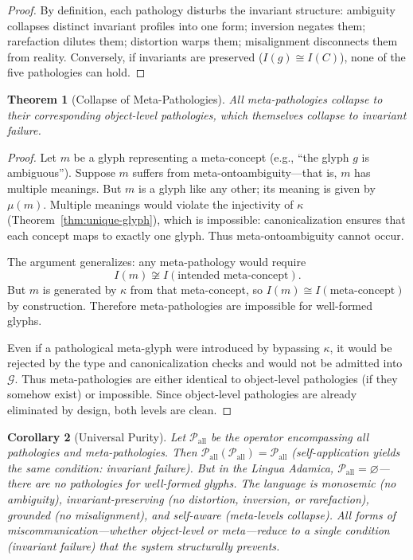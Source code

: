 \documentclass[12pt, letterpaper]{book}
\def\equiv{=}%
\def\mathfrak#1{#1}%
\newtheorem{theorem}{Theorem}[chapter]
\newtheorem{corollary}[theorem]{Corollary}
\begin{document}
\begin{proof}
By definition, each pathology disturbs the invariant structure: ambiguity collapses distinct invariant profiles into one form; inversion negates them; rarefaction dilutes them; distortion warps them; misalignment disconnects them from reality. Conversely, if invariants are preserved ($I(\mathfrak{g}) \cong I(C)$), none of the five pathologies can hold.
\end{proof}

\begin{theorem}[Collapse of Meta-Pathologies]\label{thm:meta-path-collapse}
All meta-pathologies collapse to their corresponding object-level pathologies, which themselves collapse to invariant failure.
\end{theorem}

\begin{proof}
Let $\mathfrak{m}$ be a glyph representing a meta-concept (e.g., ``the glyph $\mathfrak{g}$ is ambiguous''). Suppose $\mathfrak{m}$ suffers from meta-ontoambiguity---that is, $\mathfrak{m}$ has multiple meanings. But $\mathfrak{m}$ is a glyph like any other; its meaning is given by $\mu(\mathfrak{m})$. Multiple meanings would violate the injectivity of $\kappa$ (Theorem~\ref{thm:unique-glyph}), which is impossible: canonicalization ensures that each concept maps to exactly one glyph. Thus meta-ontoambiguity cannot occur.

The argument generalizes: any meta-pathology would require
\[
I(\mathfrak{m}) \not\cong I(\text{intended meta-concept}).
\]
But $\mathfrak{m}$ is generated by $\kappa$ from that meta-concept, so $I(\mathfrak{m}) \cong I(\text{meta-concept})$ by construction. Therefore meta-pathologies are impossible for well-formed glyphs.

Even if a pathological meta-glyph were introduced by bypassing $\kappa$, it would be rejected by the type and canonicalization checks and would not be admitted into $\mathcal{G}$. Thus meta-pathologies are either identical to object-level pathologies (if they somehow exist) or impossible. Since object-level pathologies are already eliminated by design, both levels are clean.
\end{proof}

\begin{corollary}[Universal Purity]\label{cor:purity}
Let $\mathcal{P}_{\mathrm{all}}$ be the operator encompassing all pathologies and meta-pathologies. Then $\mathcal{P}_{\mathrm{all}}(\mathcal{P}_{\mathrm{all}}) \equiv \mathcal{P}_{\mathrm{all}}$ (self-application yields the same condition: invariant failure). But in the Lingua Adamica, $\mathcal{P}_{\mathrm{all}} = \varnothing$---there are no pathologies for well-formed glyphs. The language is monosemic (no ambiguity), invariant-preserving (no distortion, inversion, or rarefaction), grounded (no misalignment), and self-aware (meta-levels collapse). All forms of miscommunication---whether object-level or meta---reduce to a single condition (invariant failure) that the system structurally prevents.
\end{corollary}
\end{document}
